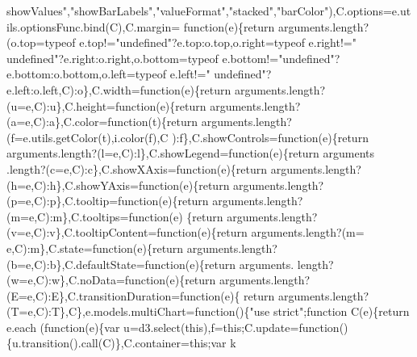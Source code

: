 \begin{DoxyCode}
{      showValues"},\textcolor{stringliteral}{"showBarLabels"},\textcolor{stringliteral}{"valueFormat"},\textcolor{stringliteral}{"stacked"},\textcolor{stringliteral}{"barColor"}),C.options=e.utils.optionsFunc.bind(C),C.margin=\textcolor{keyword}{
      function}(e)\{\textcolor{keywordflow}{return} arguments.length?(o.top=typeof e.top!=\textcolor{stringliteral}{"undefined"}?e.top:o.top,o.right=typeof e.right!=\textcolor{stringliteral}{"
      undefined"}?e.right:o.right,o.bottom=typeof e.bottom!=\textcolor{stringliteral}{"undefined"}?e.bottom:o.bottom,o.left=typeof e.left!=\textcolor{stringliteral}{"
      undefined"}?e.left:o.left,C):o\},C.width=\textcolor{keyword}{function}(e)\{\textcolor{keywordflow}{return} arguments.length?(u=e,C):u\},C.height=\textcolor{keyword}{function}(e)\{\textcolor{keywordflow}{return}
       arguments.length?(a=e,C):a\},C.color=\textcolor{keyword}{function}(t)\{\textcolor{keywordflow}{return} arguments.length?(f=e.utils.getColor(t),i.color(f),C
      ):f\},C.showControls=\textcolor{keyword}{function}(e)\{\textcolor{keywordflow}{return} arguments.length?(l=e,C):l\},C.showLegend=\textcolor{keyword}{function}(e)\{\textcolor{keywordflow}{return} arguments
      .length?(c=e,C):c\},C.showXAxis=\textcolor{keyword}{function}(e)\{\textcolor{keywordflow}{return} arguments.length?(h=e,C):h\},C.showYAxis=\textcolor{keyword}{function}(e)\{\textcolor{keywordflow}{return}
       arguments.length?(p=e,C):p\},C.tooltip=\textcolor{keyword}{function}(e)\{\textcolor{keywordflow}{return} arguments.length?(m=e,C):m\},C.tooltips=\textcolor{keyword}{function}(e)
      \{\textcolor{keywordflow}{return} arguments.length?(v=e,C):v\},C.tooltipContent=\textcolor{keyword}{function}(e)\{\textcolor{keywordflow}{return} arguments.length?(m=
      e,C):m\},C.state=\textcolor{keyword}{function}(e)\{\textcolor{keywordflow}{return} arguments.length?(b=e,C):b\},C.defaultState=\textcolor{keyword}{function}(e)\{\textcolor{keywordflow}{return} arguments.
      length?(w=e,C):w\},C.noData=\textcolor{keyword}{function}(e)\{\textcolor{keywordflow}{return} arguments.length?(E=e,C):E\},C.transitionDuration=\textcolor{keyword}{function}(e)\{\textcolor{keywordflow}{
      return} arguments.length?(T=e,C):T\},C\},e.models.multiChart=\textcolor{keyword}{function}()\{\textcolor{stringliteral}{"use strict"};\textcolor{keyword}{function} C(e)\{\textcolor{keywordflow}{return} e.each
      (\textcolor{keyword}{function}(e)\{var u=d3.select(\textcolor{keyword}{this}),f=\textcolor{keyword}{this};C.update=\textcolor{keyword}{function}()\{u.transition().call(C)\},C.container=\textcolor{keyword}{this};var k

\end{DoxyCode}

